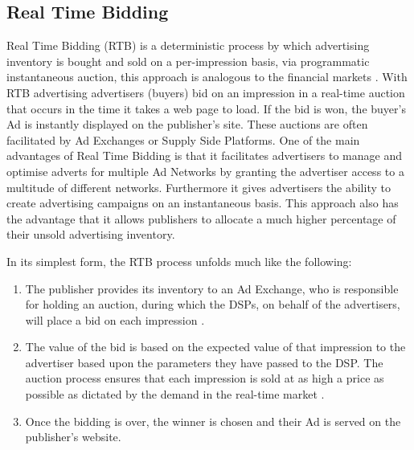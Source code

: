 \documentclass[12pt]{article}
\begin{document}
\subsection{Real Time Bidding}
Real Time Bidding (RTB) is a deterministic process by which advertising inventory is bought and sold on a per-impression basis, via programmatic instantaneous auction, this approach is analogous to the financial markets \parencite{RTB}. With RTB advertising advertisers (buyers) bid on an impression in a real-time auction that occurs in the time it takes a web page to load. If the bid is won, the buyer's Ad is instantly displayed on the publisher's site. These auctions are often facilitated by Ad Exchanges or Supply Side Platforms. One of the main advantages of Real Time Bidding is that it facilitates advertisers to manage and optimise adverts for multiple Ad Networks by granting the advertiser access to a multitude of different networks. Furthermore it gives advertisers the ability to create advertising campaigns on an instantaneous basis. This approach also has the advantage that it allows publishers to allocate a much higher percentage of their unsold advertising inventory. \newline

In its simplest form, the RTB process unfolds much like the following: 
\begin{enumerate}
\item The publisher provides its inventory to an Ad Exchange, who is responsible for holding an auction, during which the DSPs, on behalf of the advertisers, will place a bid on each impression \parencite{howRTBWorks}. 
\item The value of the bid is based on the expected value of that impression to the advertiser based upon the parameters they have passed to the DSP. The auction process ensures that each impression is sold at as high a price as possible as dictated by the demand in the real-time market \parencite{howRTBWorks}. 
\item Once the bidding is over, the winner is chosen and their Ad is served on the publisher's website. 
\end{enumerate}
\end{document}
